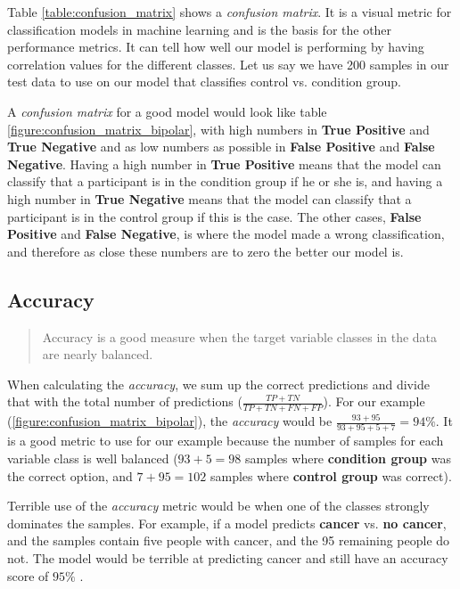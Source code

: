 Table \ref{table:confusion_matrix} shows a \textit{confusion matrix}. It is a visual metric for classification models in machine learning and is the basis for the other performance metrics. It can tell how well our model is performing by having correlation values for the different classes. Let us say we have 200 samples in our test data to use on our model that classifies control vs. condition group. 

A \textit{confusion matrix} for a good model would look like table \ref{figure:confusion_matrix_bipolar}, with high numbers in \textbf{True Positive} and \textbf{True Negative} and as low numbers as possible in \textbf{False Positive} and \textbf{False Negative}. Having a high number in \textbf{True Positive} means that the model can classify that a participant is in the condition group if he or she is, and having a high number in \textbf{True Negative} means that the model can classify that a participant is in the control group if this is the case. The other cases, \textbf{False Positive} and \textbf{False Negative}, is where the model made a wrong classification, and therefore as close these numbers are to zero the better our model is.

\subsection{Accuracy}

\blockquote[\cite{ml_metrics}]{Accuracy is a good measure when the target variable classes in the data are nearly balanced.}

When calculating the \textit{accuracy}, we sum up the correct predictions and divide that with the total number of predictions ($ \frac{TP + TN}{TP + TN + FN + FP} $). For our example (\ref{figure:confusion_matrix_bipolar}), the \textit{accuracy} would be $ \frac{93 + 95}{93 + 95 + 5 + 7} = 94\% $. It is a good metric to use for our example because the number of samples for each variable class is well balanced ($ 93+5=98 $ samples where \textbf{condition group} was the correct option, and $ 7+95=102 $ samples where \textbf{control group} was correct).

Terrible use of the \textit{accuracy} metric would be when one of the classes strongly dominates the samples. For example, if a model predicts \textbf{cancer} vs. \textbf{no cancer}, and the samples contain five people with cancer, and the 95 remaining people do not. The model would be terrible at predicting cancer and still have an accuracy score of $ 95\% $ \cite{ml_metrics}.

